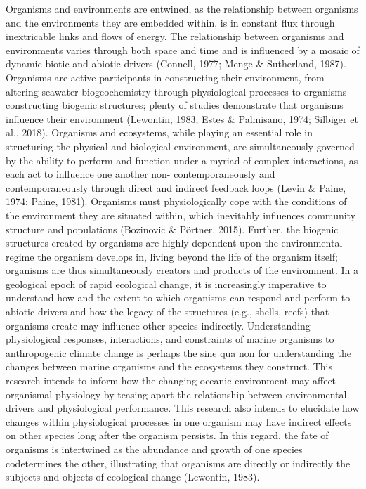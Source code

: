 \documentclass[
  11pt,
]{article}
\begin{document}
Organisms and environments are entwined, as the relationship between
organisms and the environments they are embedded within, is in constant
flux through inextricable links and flows of energy. The relationship
between organisms and environments varies through both space and time
and is influenced by a mosaic of dynamic biotic and abiotic drivers
(Connell, 1977; Menge \& Sutherland, 1987). Organisms are active
participants in constructing their environment, from altering seawater
biogeochemistry through physiological processes to organisms
constructing biogenic structures; plenty of studies demonstrate that
organisms influence their environment (Lewontin, 1983; Estes \&
Palmisano, 1974; Silbiger et al., 2018). Organisms and ecosystems, while
playing an essential role in structuring the physical and biological
environment, are simultaneously governed by the ability to perform and
function under a myriad of complex interactions, as each act to
influence one another non- contemporaneously and contemporaneously
through direct and indirect feedback loops (Levin \& Paine, 1974; Paine,
1981). Organisms must physiologically cope with the conditions of the
environment they are situated within, which inevitably influences
community structure and populations (Bozinovic \& Pörtner, 2015).
Further, the biogenic structures created by organisms are highly
dependent upon the environmental regime the organism develops in, living
beyond the life of the organism itself; organisms are thus
simultaneously creators and products of the environment. In a geological
epoch of rapid ecological change, it is increasingly imperative to
understand how and the extent to which organisms can respond and perform
to abiotic drivers and how the legacy of the structures (e.g., shells,
reefs) that organisms create may influence other species indirectly.
Understanding physiological responses, interactions, and constraints of
marine organisms to anthropogenic climate change is perhaps the sine qua
non for understanding the changes between marine organisms and the
ecosystems they construct. This research intends to inform how the
changing oceanic environment may affect organismal physiology by teasing
apart the relationship between environmental drivers and physiological
performance. This research also intends to elucidate how changes within
physiological processes in one organism may have indirect effects on
other species long after the organism persists. In this regard, the fate
of organisms is intertwined as the abundance and growth of one species
codetermines the other, illustrating that organisms are directly or
indirectly the subjects and objects of ecological change (Lewontin,
1983).
\end{document}
